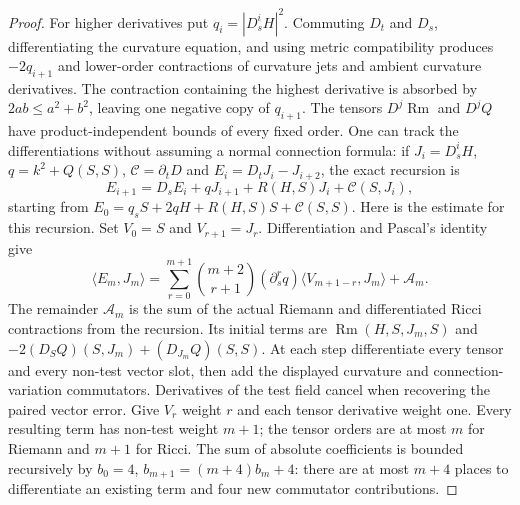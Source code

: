 \begin{proof}
For higher derivatives put $q_i=|D_s^iH|^2$.
Commuting $D_t$ and $D_s$, differentiating the curvature equation, and
using metric compatibility produces $-2q_{i+1}$ and lower-order
contractions of curvature jets and ambient curvature derivatives.
The contraction containing the highest derivative is absorbed by
$2ab\leq a^2+b^2$, leaving one negative copy of $q_{i+1}$.
The tensors $D^j\operatorname{Rm}$ and $D^jQ$ have product-independent
bounds of every fixed order.  One can track the differentiations without
assuming a normal connection formula: if $J_i=D_s^iH$,
$q=k^2+Q(S,S)$, $\mathcal C=\partial_tD$ and
$E_i=D_tJ_i-J_{i+2}$, the exact recursion is
\[
 E_{i+1}=D_sE_i+qJ_{i+1}+R(H,S)J_i+\mathcal C(S,J_i),
\]
starting from
$E_0=q_sS+2qH+R(H,S)S+\mathcal C(S,S)$.
Here is the estimate for this recursion.  Set $V_0=S$ and
$V_{r+1}=J_r$.  Differentiation and Pascal's identity give
\[
 \langle E_m,J_m\rangle
 =\sum_{r=0}^{m+1}\binom{m+2}{r+1}
       (\partial_s^r q)\langle V_{m+1-r},J_m\rangle
       +\mathcal A_m.
\]
The remainder $\mathcal A_m$ is the sum of the actual Riemann
and differentiated Ricci contractions from the recursion.
Its initial terms are
$\operatorname{Rm}(H,S,J_m,S)$ and
$-2(D_SQ)(S,J_m)+(D_{J_m}Q)(S,S)$.
At each step differentiate every tensor and every non-test
vector slot, then add the displayed curvature and
connection-variation commutators.  Derivatives of the test
field cancel when recovering the paired vector error.
Give $V_r$ weight $r$ and each tensor derivative weight one.
Every resulting term has non-test weight $m+1$; the tensor
orders are at most $m$ for Riemann and $m+1$ for Ricci.
The sum of absolute coefficients is bounded recursively by
$b_0=4$, $b_{m+1}=(m+4)b_m+4$: there are at most $m+4$
places to differentiate an existing term and four new
commutator contributions.


\end{proof}
